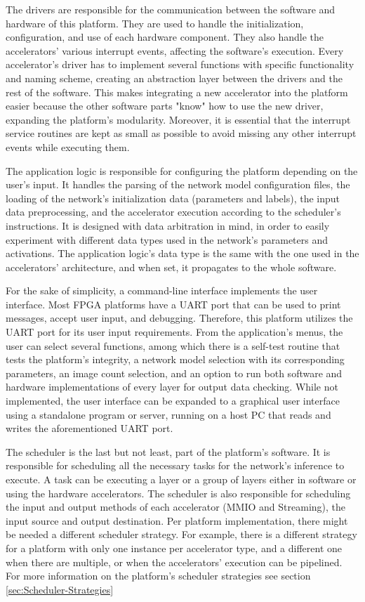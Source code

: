 The drivers are responsible for the communication between the software and hardware of this platform. They are used to handle the initialization, configuration, and use of each hardware component. They also handle the accelerators' various interrupt events, affecting the software's execution. Every accelerator's driver has to implement several functions with specific functionality and naming scheme, creating an abstraction layer between the drivers and the rest of the software. This makes integrating a new accelerator into the platform easier because the other software parts "know" how to use the new driver, expanding the platform's modularity. Moreover, it is essential that the interrupt service routines are kept as small as possible to avoid missing any other interrupt events while executing them.

The application logic is responsible for configuring the platform depending on the user's input. It handles the parsing of the network model configuration files, the loading of the network's initialization data (parameters and labels), the input data preprocessing, and the accelerator execution according to the scheduler's instructions. It is designed with data arbitration in mind, in order to easily experiment with different data types used in the network's parameters and activations. The application logic's data type is the same with the one used in the accelerators' architecture, and when set, it propagates to the whole software.

For the sake of simplicity, a command-line interface implements the user interface. Most FPGA platforms have a UART port that can be used to print messages, accept user input, and debugging. Therefore, this platform utilizes the UART port for its user input requirements. From the application's menus, the user can select several functions, among which there is a self-test routine that tests the platform's integrity, a network model selection with its corresponding parameters, an image count selection, and an option to run both software and hardware implementations of every layer for output data checking. While not implemented, the user interface can be expanded to a graphical user interface using a standalone program or server, running on a host PC that reads and writes the aforementioned UART port.

The scheduler is the last but not least, part of the platform's software. It is responsible for scheduling all the necessary tasks for the network's inference to execute. A task can be executing a layer or a group of layers either in software or using the hardware accelerators. The scheduler is also responsible for scheduling the input and output methods of each accelerator (MMIO and Streaming), the input source and output destination. Per platform implementation, there might be needed a different scheduler strategy. For example, there is a different strategy for a platform with only one instance per accelerator type, and a different one when there are multiple, or when the accelerators' execution can be pipelined. For more information on the platform's scheduler strategies see section \ref{sec:Scheduler-Strategies}

